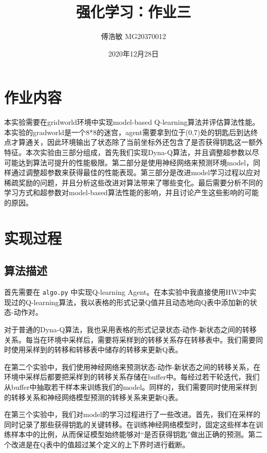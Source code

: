 \documentclass[a4paper,12pt]{article}
\begin{document}
\begin{CJK}{UTF8}{gbsn}

\title{强化学习：作业三}

\author{傅浩敏 MG20370012}

\date{2020年12月28日}

\maketitle

\section{作业内容}
本实验需要在gridworld环境中实现model-based Q-learning算法并评估算法性能。本实验的gradworld是一个8*8的迷宫，agent需要拿到位于(0,7)处的钥匙后到达终点才算通关，因此环境输出了状态除了当前坐标外还包含了是否获得钥匙这一额外特征。本次实验由三部分组成，首先我们实现Dyna-Q算法，并且调整超参数以尽可能达到算法可提升的性能极限。第二部分是使用神经网络来预测环境model，同样通过调整超参数来获得最佳的性能表现。第三部分是改进model学习过程以应对稀疏奖励的问题，并且分析这些改进对算法带来了哪些变化。最后需要分析不同的学习方式和超参数对model-based算法性能的影响，并且讨论产生这些影响的可能的原因。

\section{实现过程}
\subsection{算法描述}
首先需要在 \texttt{algo.py} 中实现Q-learning Agent。在本实验中我直接使用HW2中实现过的Q-learning算法，我以表格的形式记录Q值并且动态地向Q表中添加新的状态-动作对。

对于普通的Dyna-Q算法，我也采用表格的形式记录状态-动作-新状态之间的转移关系。每当在环境中采样后，需要将采样到的转移关系存在转移表中。我们需要同时使用采样到的转移和转移表中储存的转移来更新Q表。

在第二个实验中，我们使用神经网络来预测状态-动作-新状态之间的转移关系，在环境中采样后都要把采样到的转移关系存储在buffer中。每经过若干轮迭代，我们从buffer中抽取若干样本来训练我们的model。同样的，我们需要同时使用采样到的转移关系和神经网络模型预测的转移关系来更新Q表。

在第三个实验中，我们对model的学习过程进行了一些改进。首先，我们在采样的同时记录了那些获得钥匙的关键转移。在训练神经网络模型时，固定这些样本在训练样本中的比例，从而保证模型始终能够对“是否获得钥匙”做出正确的预测。第二个改进是在Q表中的值超过某个定义的上下界时进行截断。

\end{CJK}
\end{document}
